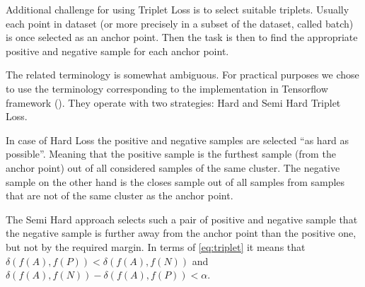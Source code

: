 Additional challenge for using Triplet Loss is to select suitable triplets.
Usually each point in dataset (or more precisely in a subset of the dataset,
called batch) is once selected as an anchor point. Then the task is then to find
the appropriate positive and negative sample for each anchor point.

The related terminology is somewhat ambiguous. For practical purposes we
chose to use the terminology corresponding to the implementation in Tensorflow
framework (\cite{tensorflow}). They operate with two strategies: Hard and Semi
Hard Triplet Loss.

In case of Hard Loss the positive and negative samples are selected ``as hard as
possible''. Meaning that the positive sample is the furthest sample (from the
anchor point) out of all considered samples of the same cluster. The negative
sample on the other hand is the closes sample out of all samples from samples
that are not of the same cluster as the anchor point.

The Semi Hard approach selects such a pair of positive and negative sample
that the negative sample is further away from the anchor point than the 
positive one, but not by the required margin. In terms of \autoref{eq:triplet}
it means that $\delta(f(A), f(P)) < \delta(f(A), f(N))$ and
$\delta(f(A), f(N)) - \delta(f(A), f(P)) < \alpha$.






